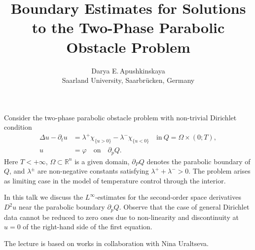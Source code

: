 \documentclass[a4paper, 12pt]{article}
\title{\textbf{Boundary Estimates for Solutions to the Two-Phase Parabolic Obstacle Problem}}
\author{Darya E.\,Apushkinskaya\\ 
Saarland University, Saarbr{\"u}cken, Germany}
\begin{document}
\maketitle

Consider the two-phase parabolic obstacle problem with non-trivial Dirichlet condition
\begin{align*}
\Delta u-\partial_tu&=\lambda^+\chi_{\{u>0\}}-\lambda^-\chi_{\{u<0\}} \quad
\text{in}\ Q=\Omega \times (0;T),\\
 u&=\varphi \quad \text{on} \quad \partial_p Q.
\end{align*}
Here $T<+\infty$, $\Omega \subset \mathbb{R}^n$ is a given domain, $\partial_PQ$ denotes the parabolic boundary of $Q$, and $\lambda^{\pm}$ are non-negative constants satisfying $\lambda^++\lambda^->0$. The problem arises as limiting case in the model of temperature control through the interior.

In this talk we discuss the $L^{\infty}$-estimates for the second-order space derivatives $D^2u$ near the parabolic boundary $\partial_p Q$. Observe that the case of general Dirichlet data cannot be reduced to zero ones due to non-linearity and discontinuity at $u=0$ of the right-hand side of the first equation.

The lecture is based on works in collaboration with Nina Uraltseva.
\end{document}

